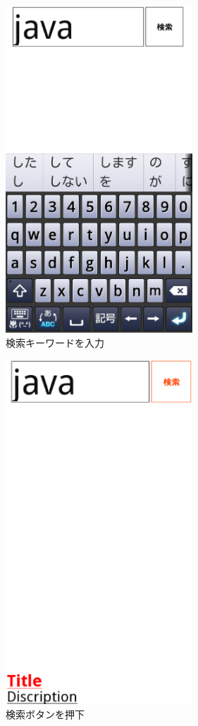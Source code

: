 \begin{figure}[htbp]
\begin{center}
\includegraphics[width=7cm]{le02.eps}
\caption{検索キーワードを入力}
\label{le02}
\end{center}
\end{figure}

\begin{figure}[htbp]
\begin{center}
\includegraphics[width=7cm]{le03.eps}
\caption{検索ボタンを押下}
\label{le03}
\end{center}
\end{figure}

